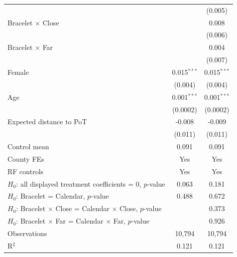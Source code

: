 {\begin{tabular}{lcc}
                                                                         &               & (0.005)\\   
   Bracelet $\times$ Close                                               &               & 0.008\\   
                                                                         &               & (0.006)\\   
   Bracelet $\times$ Far                                                 &               & 0.004\\   
                                                                         &               & (0.007)\\   
   \addlinespace[0.4em]
   Female                                                                & 0.015$^{***}$ & 0.015$^{***}$\\   
                                                                         & (0.004)       & (0.004)\\   
   Age                                                                   & 0.001$^{***}$ & 0.001$^{***}$\\   
                                                                         & (0.0002)      & (0.0002)\\   
   Expected distance to PoT                                              & -0.008        & -0.009\\   
                                                                         & (0.011)       & (0.011)\\   
   Control mean                                                          & 0.091         & 0.091\\  
   County FEs                                                            & Yes           & Yes\\  
   RF controls                                                           & Yes           & Yes\\  
   $H_0$: all displayed treatment coefficients = 0, $p$-value            & 0.063         & 0.181\\  
   $H_0$: Bracelet = Calendar, $p$-value                                 & 0.488         & 0.672\\  
   $H_0$: Bracelet $\times$ Close = Calendar $\times$ Close, $p$-value   &               & 0.373\\  
   $H_0$: Bracelet $\times$ Far = Calendar $\times$ Far, $p$-value       &               & 0.926\\  
   \midrule
   Observations                                                          & 10,794        & 10,794\\  
   R$^2$                                                                 & 0.121         & 0.121\\  
   \midrule \midrule
\end{tabular}}


